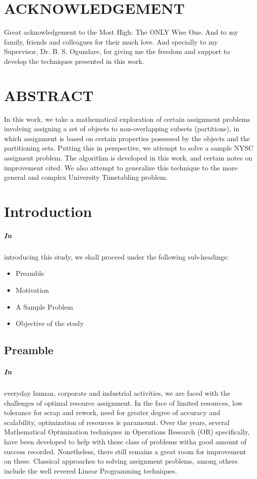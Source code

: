 \documentclass[a4paper,openany]{book}
\begin{document}
	\chapter[ACKNOWLEDGEMENT]{ \centering ACKNOWLEDGEMENT}
		Great acknowledgement to the Most High: The ONLY Wise One. And to my family, friends and colleagues for their much love. And specially to my Supervisor, Dr. B. S. Ogundare, for giving me the freedom and support to develop the techniques presented in this work.
	\chapter[ABSTRACT]{ \centering ABSTRACT}
		In this work, we take a mathematical exploration of certain assignment problems involving assigning a set of objects to non-overlapping subsets (partitions), in which assignment is based on certain properties possessed by the objects and the partitioning sets. Putting this in perspective, we attempt to solve a sample NYSC assigment problem. The algorithm is developed in this work, and certain notes on improvement cited.  We also attempt to generalize this technique to the more general and complex University Timetabling problem.
	\tableofcontents
	\listoftables
	\mainmatter
    \linespread{2.0}
    \chapter{Introduction}
        \paragraph{In}
        introducing this study, we shall proceed under the following sub-headings:
        \begin{itemize}
            \item Preamble
            \item Motivation
            \item A Sample Problem
            \item Objective of the study
        \end{itemize}
        \section{Preamble}
        \paragraph{In}
			everyday human, corporate and industrial activities, we are faced with the challenges of optimal resource assignment. In the face of limited resources, low tolerance for scrap and rework, need for greater degree of accuracy and scalability, optimization of resources is paramount.
            Over the years, several Mathematical Optimization techniques in Operations Research (OR) specifically, have been developed to help with these class of problems witha good amount of success recorded. Nonetheless, there still remains a great room for improvement on these. Classical approaches to solving assignment problems, among others include the well revered Linear Programming techniques.
\end{document}
